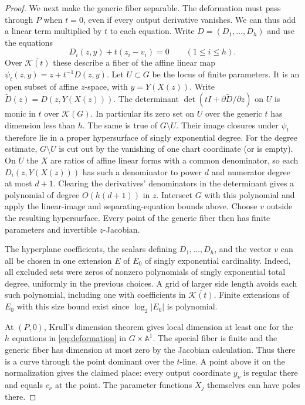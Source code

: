 \documentclass[11pt,letterpaper]{article}
\theoremstyle{definition}
\numberwithin{equation}{section}
\begin{document}
\begin{proof}
We next make the generic fiber separable. The deformation must pass through $P$ when
$t=0$, even if every output derivative vanishes. We can thus add a linear term multiplied by
$t$ to each equation. Write $D=(D_1,\ldots,D_h)$ and use the equations
\begin{equation}\label{eq:deformation}
  D_i(z,y)+t(z_i-v_i)=0 \qquad(1\le i\le h).
\end{equation}
Over $\overline{\mathcal{K}(t)}$ these describe a fiber of the affine linear map
$\psi_t(z,y)=z+t^{-1}D(z,y)$. Let $U\subset G$
be the locus of finite parameters. It is an open subset of affine $z$-space, with $y=Y(X(z))$.
Write $\widetilde{D}(z)=D(z,Y(X(z)))$. The determinant $\det(tI+\partial \widetilde{D}/\partial z)$
on $U$ is monic in $t$ over
$\mathcal{K}(G)$. In particular its zero set on $U$ over the generic $t$ has dimension less than $h$. The
same is true of $G\setminus U$. Their image closures under $\psi_t$ therefore lie in a proper hypersurface
of singly exponential degree. For the degree estimate, $G\setminus U$ is cut out by the vanishing
of one chart coordinate (or is empty). On $U$ the $X$ are ratios of affine linear forms with
a common denominator, so each $D_i(z,Y(X(z)))$ has such a denominator to power $d$ and
numerator degree at most $d+1$. Clearing the derivatives' denominators in the determinant
gives a polynomial of degree $O(h(d+1))$ in $z$. Intersect $G$ with this polynomial and apply
the linear-image and separating-equation bounds above. Choose $v$ outside the resulting
hypersurface. Every point of the generic fiber then has finite parameters and invertible
$z$-Jacobian.

The hyperplane coefficients, the scalars defining $D_1,\ldots,D_h$, and the vector $v$ can all
be chosen in one extension $E$ of $E_0$ of singly exponential cardinality. Indeed, all excluded
sets were zeros of nonzero polynomials of singly exponential total degree, uniformly in the
previous choices. A grid of larger side length avoids each such polynomial, including one
with coefficients in $\overline{\mathcal{K}(t)}$. Finite extensions of $E_0$ with this size bound
exist since $\log_2|E_0|$ is
polynomial.

At $(P,0)$, Krull's dimension theorem gives local dimension at least one for the $h$ equations
in \eqref{eq:deformation} in $G\times \mathbb{A}^1$. The special fiber is finite and the generic
fiber has dimension at most
zero by the Jacobian calculation. Thus there is a curve through the point dominant over
the $t$-line. A point above it on the normalization gives the claimed place: every output
coordinate $y_\nu$ is regular there and equals $c_\nu$ at the point. The parameter functions $X_j$
themselves can have poles there.


\end{proof}
\end{document}
